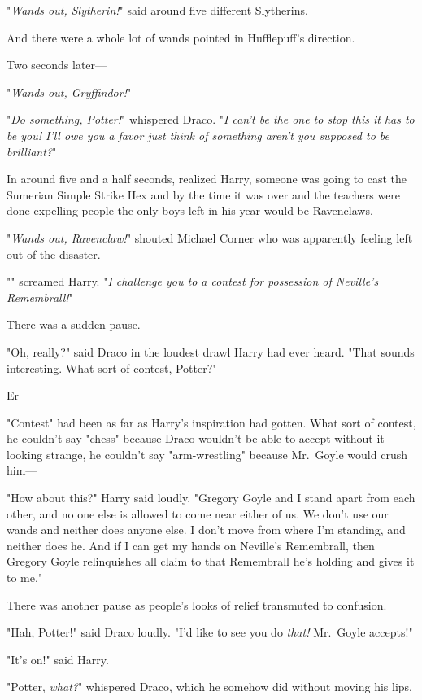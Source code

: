 "\emph{Wands out, Slytherin!}" said around five different Slytherins.

And there were a whole lot of wands pointed in Hufflepuff's direction.

Two seconds later\mbox{---}

"\emph{Wands out, Gryffindor!}"

"\emph{Do something, Potter!}" whispered Draco. "\emph{I can't be the one to
stop this it has to be you! I'll owe you a favor just think of something
aren't you supposed to be brilliant?}"

In around five and a half seconds, realized Harry, someone was going to cast
the Sumerian Simple Strike Hex and by the time it was over and the teachers
were done expelling people the only boys left in his year would be Ravenclaws.

"\emph{Wands out, Ravenclaw!}" shouted Michael Corner who was apparently
feeling left out of the disaster.

"\emph{}" screamed Harry. "\emph{I challenge you to a contest for
possession of Neville's Remembrall!}"

There was a sudden pause.

"Oh, really?" said Draco in the loudest drawl Harry had ever heard. "That
sounds interesting. What sort of contest, Potter?"

Er{\el}

"Contest" had been as far as Harry's inspiration had gotten. What sort of
contest, he couldn't say "chess" because Draco wouldn't be able to accept
without it looking strange, he couldn't say "arm-wrestling" because Mr.~Goyle
would crush him\mbox{---}

"How about this?" Harry said loudly. "Gregory Goyle and I stand apart from each
other, and no one else is allowed to come near either of us. We don't use our
wands and neither does anyone else. I don't move from where I'm standing, and
neither does he. And if I can get my hands on Neville's Remembrall, then
Gregory Goyle relinquishes all claim to that Remembrall he's holding and gives
it to me."

There was another pause as people's looks of relief transmuted to confusion.

"Hah, Potter!" said Draco loudly. "I'd like to see you do \emph{that!}
Mr.~Goyle accepts!"

"It's on!" said Harry.

"Potter, \emph{what?}" whispered Draco, which he somehow did without moving his
lips.

